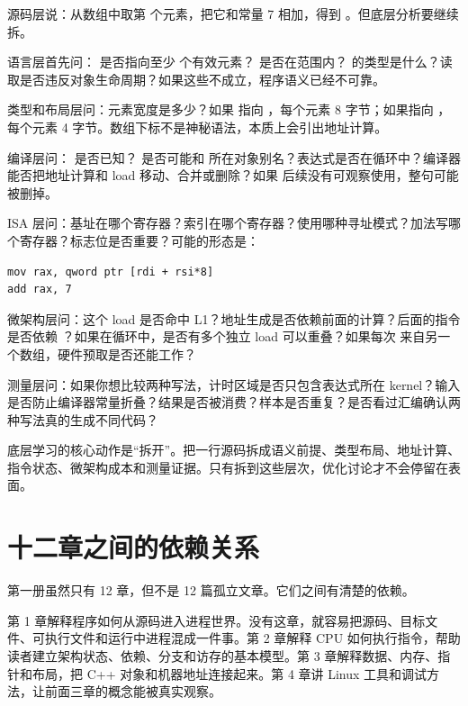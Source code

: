 源码层说：从数组中取第  个元素，把它和常量 7 相加，得到 。但底层分析要继续拆。

语言层首先问： 是否指向至少  个有效元素？ 是否在范围内？ 的类型是什么？读取是否违反对象生命周期？如果这些不成立，程序语义已经不可靠。

类型和布局层问：元素宽度是多少？如果  指向 ，每个元素 8 字节；如果指向 ，每个元素 4 字节。数组下标不是神秘语法，本质上会引出地址计算。

编译层问： 是否已知？ 是否可能和  所在对象别名？表达式是否在循环中？编译器能否把地址计算和 load 移动、合并或删除？如果  后续没有可观察使用，整句可能被删掉。

ISA 层问：基址在哪个寄存器？索引在哪个寄存器？使用哪种寻址模式？加法写哪个寄存器？标志位是否重要？可能的形态是：

\begin{lstlisting}
mov rax, qword ptr [rdi + rsi*8]
add rax, 7
\end{lstlisting}

微架构层问：这个 load 是否命中 L1？地址生成是否依赖前面的计算？后面的指令是否依赖 ？如果在循环中，是否有多个独立 load 可以重叠？如果每次  来自另一个数组，硬件预取是否还能工作？

测量层问：如果你想比较两种写法，计时区域是否只包含表达式所在 kernel？输入是否防止编译器常量折叠？结果是否被消费？样本是否重复？是否看过汇编确认两种写法真的生成不同代码？

\begin{mentalmodel}
底层学习的核心动作是“拆开”。把一行源码拆成语义前提、类型布局、地址计算、指令状态、微架构成本和测量证据。只有拆到这些层次，优化讨论才不会停留在表面。
\end{mentalmodel}

\section{十二章之间的依赖关系}

第一册虽然只有 12 章，但不是 12 篇孤立文章。它们之间有清楚的依赖。

第 1 章解释程序如何从源码进入进程世界。没有这章，就容易把源码、目标文件、可执行文件和运行中进程混成一件事。第 2 章解释 CPU 如何执行指令，帮助读者建立架构状态、依赖、分支和访存的基本模型。第 3 章解释数据、内存、指针和布局，把 C++ 对象和机器地址连接起来。第 4 章讲 Linux 工具和调试方法，让前面三章的概念能被真实观察。

